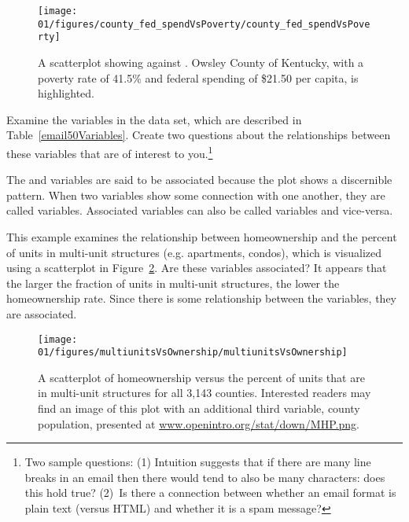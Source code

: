 \begin{figure}
\centering
\texttt{[image: 01/figures/county\_fed\_spendVsPoverty/county\_fed\_spendVsPoverty]}
\caption{A scatterplot showing  against . Owsley County of Kentucky, with a poverty rate of 41.5\% and federal spending of \$21.50 per capita, is highlighted.}
\label{county_fed_spendVsPoverty}
\end{figure}

\begin{exercise}
Examine the variables in the  data set, which are described in Table~\vref{email50Variables}. Create two questions about the relationships between these variables that are of interest to you.\footnote{Two sample questions: (1) Intuition suggests that if there are many line breaks in an email then there would tend to also be many characters: does this hold true? (2)~Is there a connection between whether an email format is plain text (versus HTML) and whether it is a spam message?}
\end{exercise}

The  and  variables are said to be associated because the plot shows a discernible pattern. When two variables show some connection with one another, they are called  variables. Associated variables can also be called  variables and vice-versa.

\begin{example}{This example examines the relationship between homeownership and the percent of units in multi-unit structures (e.g. apartments, condos), which is visualized using a scatterplot in Figure~\ref{multiunitsVsOwnership}. Are these variables associated?}
It appears that the larger the fraction of units in multi-unit structures, the lower the homeownership rate. Since there is some relationship between the variables, they are associated.
\end{example}


\begin{figure}
   \centering
   \texttt{[image: 01/figures/multiunitsVsOwnership/multiunitsVsOwnership]}
   \caption{A scatterplot of homeownership versus the percent of units that are in multi-unit structures for all 3,143 counties. Interested readers may find an image of this plot with an additional third variable, county population, presented at \href{http://www.openintro.org/stat/down/MHP.png}{www.openintro.org/stat/down/MHP.png}.}
   \label{multiunitsVsOwnership}
\end{figure}

